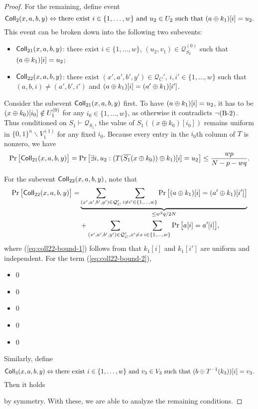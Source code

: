\begin{proof}
\smallskip

For the remaining, define event
%
$$\mathsf{Coll}_2(x,a,b,y)\Leftrightarrow\text{there exist }i\in\{1,\ldots,w\}
\text{ and }
u_2\in U_2
\text{ such that }
(a\oplus k_1)[i]=u_2.$$
%
This event can be broken down into the following two subevents:
%
\begin{itemize}
	\item $\mathsf{Coll}_{21}(x,a,b,y)$: there exist $i\in\{1,\ldots,w\}$, $(u_2,v_1)\in\mathcal{Q}_{S_2}^{(0)}$ such that $(a\oplus k_1)[i]=u_2$;
	\item $\mathsf{Coll}_{22}(x,a,b,y)$: there exist $(x',a',b',y')\in\mathcal{Q}_C'$, $i,i'\in\{1,\ldots,w\}$ such that $(a,b,i)\neq(a',b',i')$ and $(a\oplus k_1)[i]=(a'\oplus k_1)[i']$.
\end{itemize}
%
Consider the subevent $\mathsf{Coll}_{21}(x,a,b,y)$ first. To have $(a\oplus k_1)[i]=u_2$, it has to be $(x\oplus k_0)[i_0]\notin U_1^{(0)}$ for any $i_0\in\{1,\ldots,w\}$, as otherwise it contradicts $\neg\text{(B-2)}$. Thus conditioned on $S_{1} \vdash \mathcal{Q}_{S_{1}}$, the value of $S_1((x \oplus k_0)[i_0])$ remains uniform in $\{0, 1\}^{n} \backslash V_1^{(1)}$ for any fixed $i_0$. Because every entry in the $i_{0}$th column of $T$ is nonzero, we have
%
$$\Pr\big[\mathsf{Coll}_{21}(x,a,b,y)\big]=\Pr\big[\exists i,u_2:(T(\overline{S_1}(x\oplus k_0))\oplus k_1)[i]=u_2\big]\leq\frac{wp}{N-p-wq}.$$
%


For the subevent $\mathsf{Coll}_{22}(x,a,b,y)$, note that        {\small
%
\begin{align}
\Pr\big[\mathsf{Coll}_{22}(x,a,b,y)\big]        
= &  \underbrace{\sum_{(x',a',b',y')\in\mathcal{Q}_C'}\sum_{i\neq i'\in\{1,\ldots,w\}}\Pr\big[(a\oplus k_1)[i]=(a'\oplus k_1)[i']\big]}_{\leq w^2q/2N}      
\label{eq:coll22-bound-1}       \\
 & +  \sum_{(x',a',b',y')\in\mathcal{Q}_C',x'\neq x}\sum_{i\in\{1,\ldots,w\}}\Pr\big[a[i]=a'[i]\big] ,
\label{eq:coll22-bound-2}
\end{align}
}%
%
where (\ref{eq:coll22-bound-1}) follows from that $k_1[i]$ and $k_1[i']$ are uniform and independent. For the term (\ref{eq:coll22-bound-2}),
\begin{itemize}
	\item0
	\item0
	\item0
	\item0
	\item0
\end{itemize}




Similarly, define
%
$$\mathsf{Coll}_3(x,a,b,y)\Leftrightarrow\text{there exist }i\in\{1,\ldots,w\}
\text{ and }
v_3\in V_3
\text{ such that }
(b\oplus T^{-1}(k_3))[i]=v_3.$$
%
Then it holds
%

%
by symmetry. With these, we are able to analyze the remaining conditions.





\end{proof}
